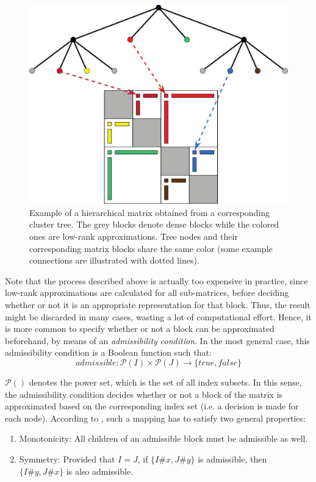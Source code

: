 \begin{figure}[h]
    \centering
    \includegraphics[width=0.9\linewidth]{chapters/4_hierarchical_matrices/figures/hierarchical_cluster.pdf}
    \caption[Hierarchical Matrix from Cluster Tree]{Example of a hierarchical matrix obtained from a corresponding cluster tree. The grey blocks denote dense blocks while the colored ones are low-rank approximations. Tree nodes and their corresponding matrix blocks share the same color (some example connections are illustrated with dotted lines).}
    \label{fig:hierarchical_cluster}
\end{figure}

Note that the process described above is actually too expensive in practice, since low-rank approximations are calculated for all sub-matrices, before deciding whether or not it is an appropriate representation for that block. Thus, the result might be discarded in many cases, wasting a lot of computational effort. Hence, it is more common to specify whether or not a block can be approximated beforehand, by means of an \textit{admissibility condition}. In the most general case, this admissibility condition is a Boolean function such that:
\begin{equation}
\label{eqn:admissibility}
    admissible: \mathcal{P}(I)\times \mathcal{P}(J) \rightarrow \{true, false\}
\end{equation}

\noindent $\mathcal{P}()$ denotes the power set, which is the set of all index subsets. In this sense, the admissibility condition decides whether or not a block of the matrix is approximated based on the corresponding index set (i.e. a decision is made for each node). According to \cite{hackbusch_hierarchical_2015}, such a mapping has to satisfy two general properties:
\begin{enumerate}
    \item Monotonicity: All children of an admissible block must be admissible as well.
    \item Symmetry: Provided that $I=J$, if $\{I\#x,J\#y\}$ is admissible, then $\{I\#y,J\#x\}$ is also admissible.
\end{enumerate}


